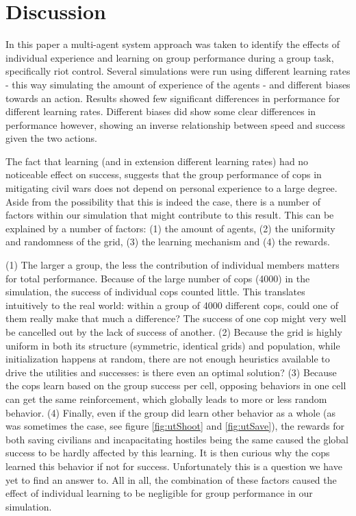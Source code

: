 \section{Discussion}
In this paper a multi-agent system approach was taken to identify the effects of individual experience and learning on group performance during a group task, specifically riot control. Several simulations were run using different learning rates - this way simulating the amount of experience of the agents - and different biases towards an action. Results showed few significant differences in performance for different learning rates. Different biases did show some clear differences in performance however, showing an inverse relationship between speed and success given the two actions.

The fact that learning (and in extension different learning rates) had no noticeable effect on success, suggests that the group performance of cops in mitigating civil wars does not depend on personal experience to a large degree. Aside from the possibility that this is indeed the case, there is a number of factors within our simulation that might contribute to this result.
This can be explained by a number of factors: (1) the amount of agents, (2) the uniformity and randomness of the grid, (3) the learning mechanism and (4) the rewards. 

(1) The larger a group, the less the contribution of individual members matters for total performance. Because of the large number of cops (4000) in the simulation, the success of individual cops counted little. This translates intuitively to the real world: within a group of 4000 different cops, could one of them really make that much a difference? The success of one cop might very well be cancelled out by the lack of success of another.
(2) Because the grid is highly uniform in both its structure (symmetric, identical grids) and population, while initialization happens at random, there are not enough heuristics available to drive the utilities and successes: is there even an optimal solution? (3) Because the cops learn based on the group success per cell, opposing behaviors in one cell can get the same reinforcement, which globally leads to more or less random behavior. (4) Finally, even if the group did learn other behavior as a whole (as was sometimes the case, see figure \ref{fig:utShoot} and \ref{fig:utSave}), the rewards for both saving civilians and incapacitating hostiles being the same caused the global success to be hardly affected by this learning. It is then curious why the cops learned this behavior if not for success. Unfortunately this is a question we have yet to find an answer to.
All in all, the combination of these factors caused the effect of individual learning to be negligible for group performance in our simulation.

